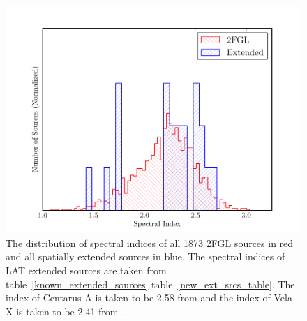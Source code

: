 \documentclass[12pt,preprint]{aastex}
\begin{document}
\clearpage
\begin{figure}
  \begin{center}
    \includegraphics{summary_plots/compare_index_2FGL.pdf}
    \end{center}
    \caption{
    The distribution of spectral indices of all 1873 2FGL sources in
    red and all spatially extended sources in blue. The
    spectral indices of LAT extended sources are taken from
    table~\ref{known_extended_sources} table~\ref{new_ext_srcs_table}.
    The index of Centarus A is taken to be 2.58 from 
    \cite{second_cat} and the index of Vela X is taken to be 2.41
    from \cite{velax}. }\label{compare_index_2FGL}
  \end{figure}
\end{document}
